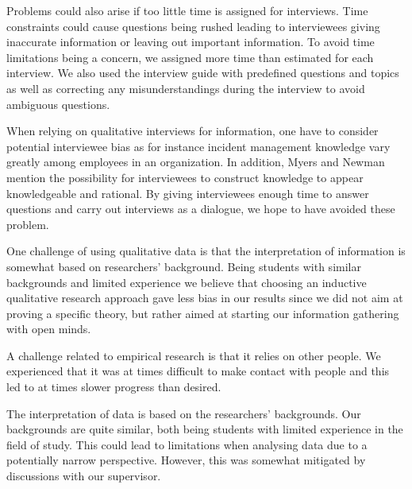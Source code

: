 Problems could also arise if too little time is assigned for interviews. Time constraints could cause questions being rushed leading to interviewees giving inaccurate information or leaving out important information. To avoid time limitations being a concern, we assigned more time than estimated for each interview. We also used the interview guide with predefined questions and topics as well as correcting any misunderstandings during the interview to avoid ambiguous questions.

When relying on qualitative interviews for information, one have to consider potential interviewee bias as for instance incident management knowledge vary greatly among employees in an organization. In addition, Myers and Newman mention the possibility for interviewees to construct knowledge to appear knowledgeable and rational. By giving interviewees enough time to answer questions and carry out interviews as a dialogue, we hope to have avoided these problem.

One challenge of using qualitative data is that the interpretation of information is somewhat based on researchers' background. Being students with similar backgrounds and limited experience we believe that choosing an inductive qualitative research approach gave less bias in our results since we did not aim at proving a specific theory, but rather aimed at starting our information gathering with open minds. 

A challenge related to empirical research is that it relies on other people. We experienced that it was at times difficult to make contact with people and this led to at times slower progress than desired.

The interpretation of data is based on the researchers' backgrounds. Our backgrounds are quite similar, both being students with limited experience in the field of study. This could lead to limitations when analysing data due to a potentially narrow perspective. However, this was somewhat mitigated by discussions with our supervisor.


